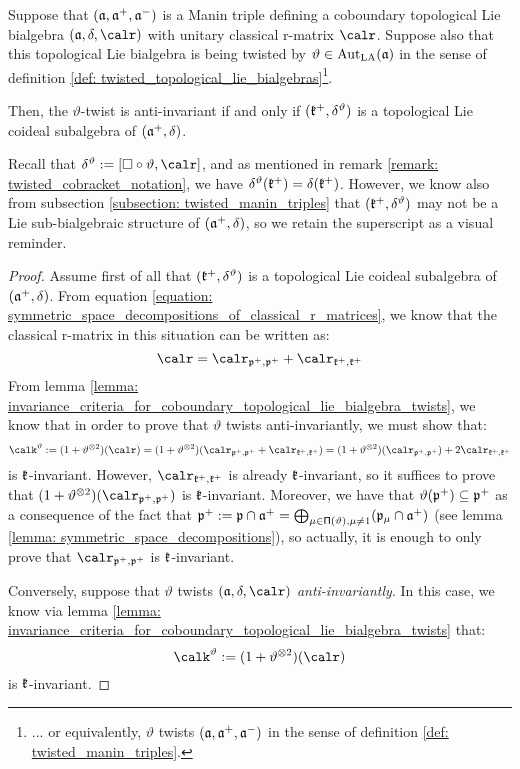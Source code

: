         \begin{proposition} \label{prop: anti_invariantly_twisted_coboundary_lie_bialgebras_are_lie_coideal_subalgebras}
            Suppose that $(\mathfrak{a}, \mathfrak{a}^+, \mathfrak{a}^-)$ is a Manin triple defining a coboundary topological Lie bialgebra $(\a, \delta, \calr)$ with unitary classical r-matrix $\calr$. Suppose also that this topological Lie bialgebra is being twisted by $\vartheta \in \operatorname{Aut}_{\mathrm{LA}}(\mathfrak{a})$ in the sense of definition \ref{def: twisted_topological_lie_bialgebras}\footnote{... or equivalently, $\vartheta$ twists $(\mathfrak{a}, \mathfrak{a}^+, \mathfrak{a}^-)$ in the sense of definition \ref{def: twisted_manin_triples}.}.
            
            Then, the $\vartheta$-twist is anti-invariant if and only if $(\mathfrak{k}^+, \delta^{\vartheta})$ is a topological Lie coideal subalgebra of $(\mathfrak{a}^+, \delta)$.
        \end{proposition}
        \begin{remark}
            Recall that $\delta^{\vartheta} := [\Box \circ \vartheta, \calr]$, and as mentioned in remark \ref{remark: twisted_cobracket_notation}, we have $\delta^{\vartheta}(\mathfrak{k}^+) = \delta(\mathfrak{k}^+)$. However, we know also from subsection \ref{subsection: twisted_manin_triples} that $(\mathfrak{k}^+, \delta^{\vartheta})$ may not be a Lie sub-bialgebraic structure of $(\mathfrak{a}^+, \delta)$, so we retain the superscript \say{$\vartheta$} as a visual reminder.
        \end{remark}
            \begin{proof}
                Assume first of all that $(\mathfrak{k}^+, \delta^{\vartheta})$ is a topological Lie coideal subalgebra of $(\mathfrak{a}^+, \delta)$. From equation \eqref{equation: symmetric_space_decompositions_of_classical_r_matrices}, we know that the classical r-matrix in this situation can be written as:
                    $$\calr = \calr_{\p^+, \p^+} + \calr_{\k^+, \k^+}$$
                From lemma \ref{lemma: invariance_criteria_for_coboundary_topological_lie_bialgebra_twists}, we know that in order to prove that $\vartheta$ twists anti-invariantly, we must show that:
                    $$\calk^{\vartheta} := (1 + \vartheta^{\tensor 2})(\calr) = (1 + \vartheta^{\tensor 2})(\calr_{\p^+, \p^+} + \calr_{\k^+, \k^+}) = (1 + \vartheta^{\tensor 2})(\calr_{\p^+, \p^+}) + 2\calr_{\k^+, \k^+}$$
                is $\mathfrak{k}$-invariant. However, $\calr_{\k^+, \k^+}$ is already $\mathfrak{k}$-invariant, so it suffices to prove that $(1 + \vartheta^{\tensor 2})(\calr_{\p^+, \p^+})$ is $\mathfrak{k}$-invariant. Moreover, we have that $\vartheta(\mathfrak{p}^+) \subseteq \mathfrak{p}^+$ as a consequence of the fact that $\mathfrak{p}^+ := \mathfrak{p} \cap \mathfrak{a}^+ = \bigoplus_{ \mu \in \mathsf{\Pi}(\vartheta), \mu \not = 1 } (\mathfrak{p}_{\mu} \cap \mathfrak{a}^+)$ (see lemma \ref{lemma: symmetric_space_decompositions}), so actually, it is enough to only prove that $\calr_{\p^+, \p^+}$ is $\mathfrak{k}$-invariant. 

                Conversely, suppose that $\vartheta$ twists $(\a, \delta, \calr)$ \textit{anti-invariantly}. In this case, we know via lemma \ref{lemma: invariance_criteria_for_coboundary_topological_lie_bialgebra_twists} that:
                    $$\calk^{\vartheta} := (1 + \vartheta^{\tensor 2})(\calr)$$
                is $\mathfrak{k}$-invariant.
            \end{proof}

